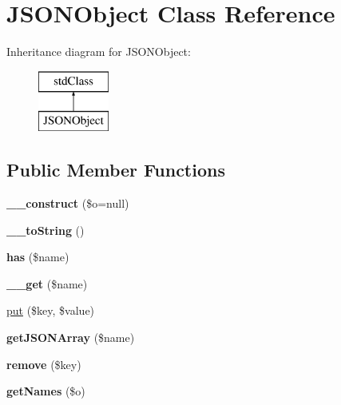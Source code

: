 \hypertarget{class_j_s_o_n_object}{\section{J\+S\+O\+N\+Object Class Reference}
\label{class_j_s_o_n_object}
}
Inheritance diagram for J\+S\+O\+N\+Object\+:\begin{figure}[H]
\begin{center}
\leavevmode
\includegraphics[height=2.000000cm]{class_j_s_o_n_object}
\end{center}
\end{figure}
\subsection*{Public Member Functions}
\begin{DoxyCompactItemize}
\item 
\hypertarget{class_j_s_o_n_object_a9043680c03da5cd8c9d1544ae047ff54}{{\bfseries \+\_\+\+\_\+construct} (\$o=null)}\label{class_j_s_o_n_object_a9043680c03da5cd8c9d1544ae047ff54}

\item 
\hypertarget{class_j_s_o_n_object_a7516ca30af0db3cdbf9a7739b48ce91d}{{\bfseries \+\_\+\+\_\+to\+String} ()}\label{class_j_s_o_n_object_a7516ca30af0db3cdbf9a7739b48ce91d}

\item 
\hypertarget{class_j_s_o_n_object_a623d004aa083376c599112f235c0af9d}{{\bfseries has} (\$name)}\label{class_j_s_o_n_object_a623d004aa083376c599112f235c0af9d}

\item 
\hypertarget{class_j_s_o_n_object_abc8e9e31bb15c8a44c3210ec551407c8}{{\bfseries \+\_\+\+\_\+get} (\$name)}\label{class_j_s_o_n_object_abc8e9e31bb15c8a44c3210ec551407c8}

\item 
\hyperlink{class_j_s_o_n_object_af4956d7576397b75ff7168a8861a1655}{put} (\$key, \$value)
\item 
\hypertarget{class_j_s_o_n_object_a811737e7e3fce04290c95338c08169a1}{{\bfseries get\+J\+S\+O\+N\+Array} (\$name)}\label{class_j_s_o_n_object_a811737e7e3fce04290c95338c08169a1}

\item 
\hypertarget{class_j_s_o_n_object_a95483af4e2c07dc9893fe058b026bd5d}{{\bfseries remove} (\$key)}\label{class_j_s_o_n_object_a95483af4e2c07dc9893fe058b026bd5d}

\item 
\hypertarget{class_j_s_o_n_object_a5d7de00dd7955482e9cda95d37dc1fb0}{{\bfseries get\+Names} (\$o)}\label{class_j_s_o_n_object_a5d7de00dd7955482e9cda95d37dc1fb0}

\end{DoxyCompactItemize}


